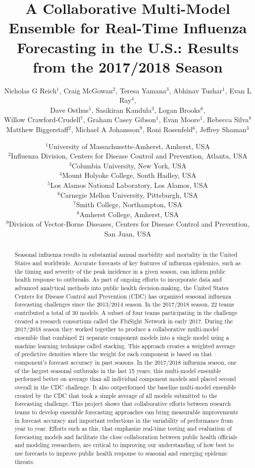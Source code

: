 \documentclass{article}\usepackage[]{graphicx}\usepackage[]{color}
\title{A Collaborative Multi-Model Ensemble for Real-Time Influenza Forecasting in the U.S.: Results from the 2017/2018 Season}
\author{Nicholas G Reich$^1$, Craig McGowan$^2$, Teresa Yamana$^3$, Abhinav Tushar$^1$, Evan L Ray$^4$,\\
Dave Osthus$^5$, Sasikiran Kandula$^3$, Logan Brooks$^6$,\\
Willow Crawford-Crudell$^7$, Graham Casey Gibson$^1$, Evan Moore$^1$, Rebecca Silva$^8$\\Matthew Biggerstaff$^2$, Michael A Johansson$^9$, Roni Rosenfeld$^6$, Jeffrey Shaman$^3$}
\date{%
    $^1$University of Massachusetts-Amherst, Amherst, USA\\%
    $^2$Influenza Division, Centers for Disease Control and Prevention, Atlanta, USA\\
    $^3$Columbia University, New York, USA\\
    $^4$Mount Holyoke College, South Hadley, USA\\
    $^5$Los Alamos National Laboratory, Los Alamos, USA\\
    $^6$Carnegie Mellon University, Pittsburgh, USA\\%
    $^7$Smith College, Northampton, USA\\
    $^8$Amherst College, Amherst, USA\\
    $^9$Division of Vector-Borne Diseases, Centers for Disease Control and Prevention, San Juan, USA\\
}
\begin{document}

\maketitle











\begin{abstract}
Seasonal influenza results in substantial annual morbidity and mortality in the United States and worldwide.
Accurate forecasts of key features of influenza epidemics, such as the timing and severity of the peak incidence in a given season, can inform public health response to outbreaks.
As part of ongoing efforts to incorporate data and advanced analytical methods into public health decision-making, the United States Centers for Disease Control and Prevention (CDC) has organized seasonal influenza forecasting challenges since the 2013/2014 season. 
In the 2017/2018 season, 22 teams contributed a total of 30 models. 
A subset of four teams participating in the challenge created a research consortium called the FluSight Network in early 2017.
During the 2017/2018 season they worked together to produce a collaborative multi-model ensemble that combined 21 separate component models into a single model using a machine learning technique called stacking.
This approach creates a weighted average of predictive densities where the weight for each component is based on that component's forecast accuracy in past seasons.
In the 2017/2018 influenza season, one of the largest seasonal outbreaks in the last 15 years, this multi-model ensemble performed better on average than all individual component models and placed second overall in the CDC challenge.
It also outperformed the baseline multi-model ensemble created by the CDC that took a simple average of all models submitted to the forecasting challenge.
This project shows that collaborative efforts between research teams to develop ensemble forecasting approaches can bring measurable improvements in forecast accuracy and important reductions in the variability of performance from year to year.
Efforts such as this, that emphasize real-time testing and evaluation of forecasting models and facilitate the close collaboration between public health officials and modeling researchers, are critical to improving our understanding of how best to use forecasts to improve public health response to seasonal and emerging epidemic threats.
\end{abstract}
\end{document}
